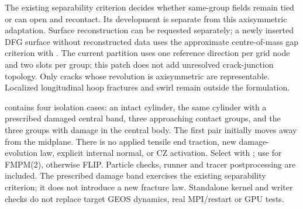 The existing separability criterion decides whether same-group fields remain
tied or can open and recontact. Its development is separate from this
axisymmetric adaptation. Surface reconstruction can be requested separately;
a newly inserted DFG surface without reconstructed data uses the approximate
centre-of-mass gap criterion with .
The current partition uses one reference direction per grid node and two
slots per group; this patch does not add unresolved crack-junction topology.
Only cracks whose revolution is axisymmetric are representable. Localized
longitudinal hoop fractures and swirl remain outside the formulation.

 contains four isolation cases: an intact
cylinder, the same cylinder with a prescribed damaged central band, three
approaching contact groups, and the three groups with damage in the central
body. The first pair initially moves away from the midplane. There is no
applied tensile end traction, new damage-evolution law, explicit internal
normal, or CZ activation. Select with ; use
 for FMPM(2), otherwise FLIP. Particle checks,
runner and tracer postprocessing are included. The prescribed damage band exercises the existing separability criterion; it does not introduce a new fracture law. Standalone kernel and writer checks do not replace target GEOS dynamics, real MPI/restart or GPU tests.

